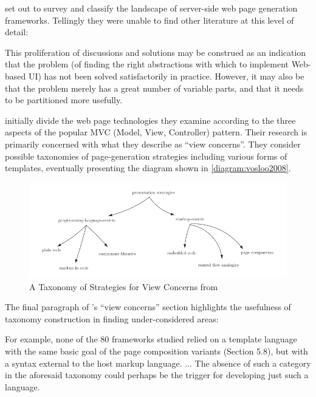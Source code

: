 \citet{Vosloo2008} set out to survey and classify the landscape of server-side web page generation frameworks. Tellingly they were unable to find other literature at this level of detail:

\begin{displayquote}
This proliferation of discussions and solutions may be construed as an indication that the problem (of finding the right abstractions with which to implement Web-based UI) has not been solved satisfactorily in practice. However, it may also be that the problem merely has a great number of variable parts, and that it needs to be partitioned more usefully. \citep{Vosloo2008}
\end{displayquote}

\citeauthor{Vosloo2008} initially divide the web page technologies they examine according to the three aspects of the popular MVC (Model, View, Controller) pattern. Their research is primarily concerned with what they describe as \enquote{view concerns}. They consider possible taxonomies of page-generation strategies including various forms of templates, eventually presenting the diagram shown in \autoref{diagram:vosloo2008}.

\begin{figure}[ht!]
\centering
\includegraphics[width=130mm]{Figures/taxonomy.png}
\caption{A Taxonomy of Strategies for View Concerns from \citet{Vosloo2008}}
\label{diagram:vosloo2008}
\end{figure}

The final paragraph of \citeauthor{Vosloo2008}'s \enquote{view concerns} section highlights the usefulness of taxonomy construction in finding under-considered areas:

\begin{displayquote}
For example, none of the 80 frameworks studied relied on a template language with the same basic goal of the page composition variants (Section 5.8), but with a syntax external to the host markup language. ... The absence of such a category in the aforesaid taxonomy could perhaps be the trigger for developing just such a language. \citep{Vosloo2008}
\end{displayquote}

